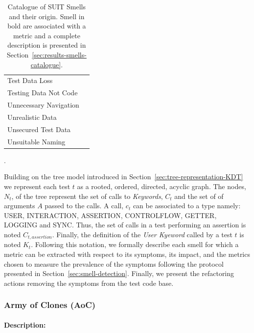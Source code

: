\begin{table}
\begin{tabularx}{\textwidth}{>{\raggedright}p{1.5in}>{\raggedright}p{4in}}
\scriptsize{Test Data Loss} & \scriptsize{\cite{Siminiuc2019}} \tabularnewline

\scriptsize{Testing Data Not Code} & \scriptsize{\cite{Dharmender2017}} \tabularnewline 

\scriptsize{Unnecessary Navigation} & \scriptsize{\cite{Archer2010}} \tabularnewline 

\scriptsize{Unrealistic Data} & \scriptsize{\cite{Goldberg2019}} \tabularnewline 

\scriptsize{Unsecured Test Data} & \scriptsize{\cite{Morlion2019}} \tabularnewline

\scriptsize{Unsuitable Naming} & \scriptsize{\cite{Chen2012, Goldberg2019, Shay2019, Sheth2020}} \tabularnewline

\hline
\end{tabularx}

\caption{Catalogue of SUIT Smells and their origin. Smell in bold are associated with a metric and a complete description is presented in Section~\ref{sec:results-smells-catalogue}.}
\label{tab:smell-catalogue}.
\end{table}

Building on the tree model introduced in Section~\ref{sec:tree-representation-KDT} we represent each test $t$ as a rooted, ordered, directed, acyclic graph. The nodes, $N_t$, of the tree represent the set of calls to \emph{Keywords}, $C_t$ and the set of of arguments $A$ passed to the calls. A call, $c_t$ can be associated to a type namely: USER, INTERACTION, ASSERTION, CONTROLFLOW, GETTER, LOGGING and SYNC. Thus, the set of calls in a test performing an assertion is noted $C_{t, assertion}$. Finally, the definition of the \emph{User Kyeword} called by a test $t$ is noted $K_t$. Following this notation, we formally describe each smell for which a metric can be extracted with respect to its symptoms, its impact, and the metrics chosen to measure the prevalence of the symptoms following the protocol presented in Section~\ref{sec:smell-detection}. Finally, we present the refactoring actions removing the symptoms from the test code base.

\subsubsection{Army of Clones (AoC)}

\paragraph{Description:}

